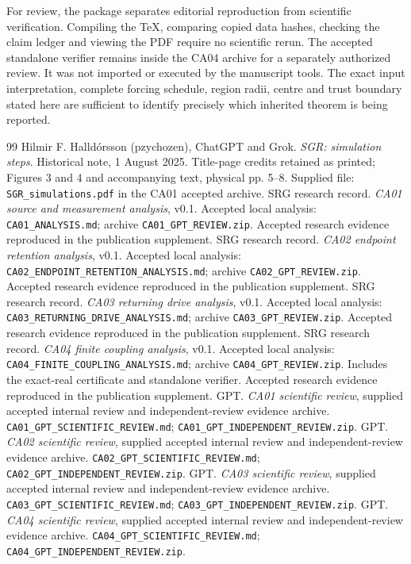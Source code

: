 \documentclass[11pt,a4paper]{article}
\newcommand{\FloatBarrier}{\clearpage}
\numberwithin{equation}{section}
\begin{document}
For review, the package separates editorial reproduction from scientific verification. Compiling the TeX, comparing copied data hashes, checking the claim ledger and viewing the PDF require no scientific rerun. The accepted standalone verifier remains inside the CA04 archive for a separately authorized review. It was not imported or executed by the manuscript tools. The exact input interpretation, complete forcing schedule, region radii, centre and trust boundary stated here are sufficient to identify precisely which inherited theorem is being reported.

\FloatBarrier
\clearpage
\begin{thebibliography}{99}
 Hilmir F. Halldórsson (pzychozen), ChatGPT and Grok. \emph{SGR: simulation steps}. Historical note, 1 August 2025. Title-page credits retained as printed; Figures 3 and 4 and accompanying text, physical pp. 5--8. Supplied file: \texttt{SGR\_simulations.pdf} in the CA01 accepted archive.
 SRG research record. \emph{CA01 source and measurement analysis}, v0.1. Accepted local analysis: \texttt{CA01\_ANALYSIS.md}; archive \texttt{CA01\_GPT\_REVIEW.zip}. Accepted research evidence reproduced in the publication supplement.
 SRG research record. \emph{CA02 endpoint retention analysis}, v0.1. Accepted local analysis: \texttt{CA02\_ENDPOINT\_RETENTION\_ANALYSIS.md}; archive \texttt{CA02\_GPT\_REVIEW.zip}. Accepted research evidence reproduced in the publication supplement.
 SRG research record. \emph{CA03 returning drive analysis}, v0.1. Accepted local analysis: \texttt{CA03\_RETURNING\_DRIVE\_ANALYSIS.md}; archive \texttt{CA03\_GPT\_REVIEW.zip}. Accepted research evidence reproduced in the publication supplement.
 SRG research record. \emph{CA04 finite coupling analysis}, v0.1. Accepted local analysis: \texttt{CA04\_FINITE\_COUPLING\_ANALYSIS.md}; archive \texttt{CA04\_GPT\_REVIEW.zip}. Includes the exact-real certificate and standalone verifier. Accepted research evidence reproduced in the publication supplement.
 GPT. \emph{CA01 scientific review}, supplied accepted internal review and independent-review evidence archive. \texttt{CA01\_GPT\_SCIENTIFIC\_REVIEW.md}; \texttt{CA01\_GPT\_INDEPENDENT\_REVIEW.zip}.
 GPT. \emph{CA02 scientific review}, supplied accepted internal review and independent-review evidence archive. \texttt{CA02\_GPT\_SCIENTIFIC\_REVIEW.md}; \texttt{CA02\_GPT\_INDEPENDENT\_REVIEW.zip}.
 GPT. \emph{CA03 scientific review}, supplied accepted internal review and independent-review evidence archive. \texttt{CA03\_GPT\_SCIENTIFIC\_REVIEW.md}; \texttt{CA03\_GPT\_INDEPENDENT\_REVIEW.zip}.
 GPT. \emph{CA04 scientific review}, supplied accepted internal review and independent-review evidence archive. \texttt{CA04\_GPT\_SCIENTIFIC\_REVIEW.md}; \texttt{CA04\_GPT\_INDEPENDENT\_REVIEW.zip}.
\end{thebibliography}
\end{document}
